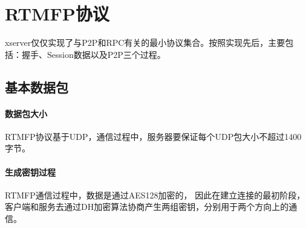 \chapter{RTMFP协议}

xserver仅仅实现了与P2P和RPC有关的最小协议集合。按照实现先后，主要包括：握手、Session数据以及P2P三个过程。

\section{基本数据包}

\subsubsection{数据包大小}
RTMFP协议基于UDP，通信过程中，服务器要保证每个UDP包大小不超过1400字节。

\subsubsection{生成密钥过程}
RTMFP通信过程中，数据是通过AES128加密的，
因此在建立连接的最初阶段，
客户端和服务去通过DH加密算法协商产生两组密钥，分别用于两个方向上的通信。

